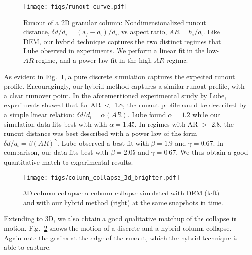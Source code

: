 \begin{figure}
  \centering
  \texttt{[image: figs/runout\_curve.pdf]}
  \caption{
    Runout of a 2D granular column: Nondimensionalized runout distance, $\delta d/d_i=(d_f-d_i) / d_i$, vs aspect ratio, $AR = h_i / d_i$. Like DEM, our hybrid technique captures the two distinct regimes that Lube \cite{Lube:2005} observed in experiments. We perform a linear fit in the low-$AR$ regime, and a power-law fit in the high-$AR$ regime.}
  \label{fig:hybrid:runout_curve}
\end{figure}

As evident in Fig.~\ref{fig:hybrid:runout_curve}, a pure discrete simulation captures the expected runout profile. Encouragingly, our hybrid method
captures a similar runout profile, with a clear turnover point. In the aforementioned experimental study by Lube, experiments showed that for AR $<$ 1.8, the runout profile could be described
by a simple linear relation:  $\delta d/d_i=\alpha(AR)$. Lube found $\alpha = 1.2$ while our simulation data fits best with with $\alpha = 1.45$. 
In regimes with AR $>$ 2.8, the runout distance was best described with a power law of the form  $\delta d/d_i=\beta(AR)^\gamma$. Lube observed a best-fit with $\beta = 1.9$ and $\gamma = 0.67$. In comparison, our data fits best with $\beta = 2.05$ and $\gamma = 0.67$. We thus obtain a good quantitative match to experimental results.

\begin{figure}
  \centering
  \texttt{[image: figs/column\_collapse\_3d\_brighter.pdf]}
  \caption{
    3D column collapse: a column collapse simulated with DEM (left) and with our hybrid method (right) at the same snapshots in time.
  }
  \label{fig:hybrid:column_collapse_3d}
\end{figure}

Extending to 3D, we also obtain a good qualitative matchup of the collapse in motion. Fig.~\ref{fig:hybrid:column_collapse_3d} shows the motion of a discrete and a hybrid column collapse.
Again note the grains at the edge of the runout, which the hybrid technique is able to capture.

